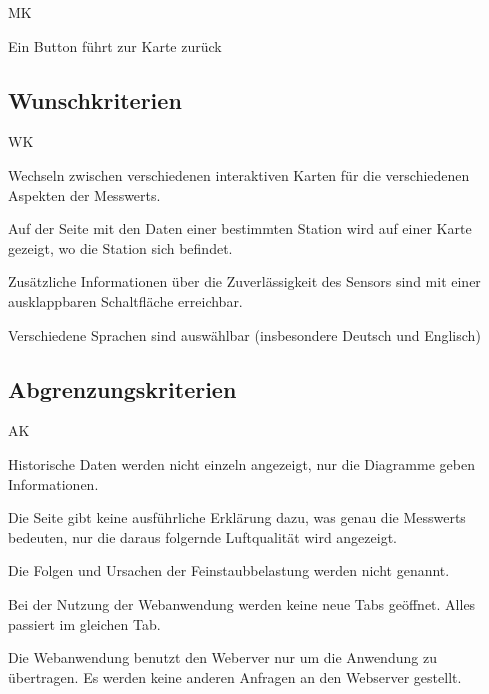 \begin{Kriterien}{MK}	
	\item Ein Button führt zur Karte zurück
 
\end{Kriterien}

\newpage
\subsection{Wunschkriterien}
\setcounter{counter}{10}
\begin{Kriterien}{WK}

	\item Wechseln zwischen verschiedenen interaktiven Karten für die verschiedenen Aspekten der \glspl{Messwert}.

	\item Auf der Seite mit den Daten einer bestimmten \gls{Station} wird auf einer Karte gezeigt, wo die \gls{Station} sich befindet. 

	\item Zusätzliche Informationen über die Zuverlässigkeit des Sensors sind mit einer ausklappbaren Schaltfläche erreichbar.

	\item Verschiedene Sprachen sind auswählbar (insbesondere Deutsch und Englisch)

\end{Kriterien}

\subsection{Abgrenzungskriterien}
\setcounter{counter}{10}
\begin{Kriterien}{AK}

	\item Historische Daten werden nicht einzeln angezeigt, nur die Diagramme geben Informationen.
	
	\item Die Seite gibt keine ausführliche Erklärung dazu, was genau die \glspl{Messwert} bedeuten, nur die daraus folgernde Luftqualität wird angezeigt. 
	
	\item Die Folgen und Ursachen der Feinstaubbelastung werden nicht genannt.
	
	\item Bei der Nutzung der \gls{Webanwendung} werden keine neue Tabs geöffnet. Alles passiert im gleichen Tab.
	
	\item Die \gls{Webanwendung} benutzt den Weberver nur um die Anwendung zu übertragen. 
		Es werden keine anderen Anfragen an den \gls{Webserver} gestellt.
	
\end{Kriterien}
